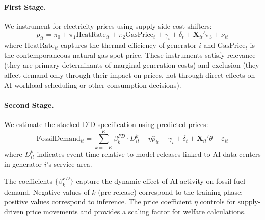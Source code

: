 \documentclass[sigconf,authordraft]{acmart}
\begin{document}
\paragraph{First Stage.} We instrument for electricity prices using supply-side cost shifters:
\begin{equation}
p_{it} = \pi_0 + \pi_1 \text{HeatRate}_{it} + \pi_2 \text{GasPrice}_{t} + \gamma_i + \delta_t + \mathbf{X}_{it}'\pi_3 + \nu_{it}
\label{eq:firststage}
\end{equation}
where $\text{HeatRate}_{it}$ captures the thermal efficiency of generator $i$ and $\text{GasPrice}_t$ is the contemporaneous natural gas spot price. These instruments satisfy relevance (they are primary determinants of marginal generation costs) and exclusion (they affect demand only through their impact on prices, not through direct effects on AI workload scheduling or other consumption decisions).

\paragraph{Second Stage.} We estimate the stacked DiD specification using predicted prices:
\begin{equation}
\text{FossilDemand}_{it} = \sum_{k=-K}^{K} \beta_k^{FD} \cdot D_{it}^k + \eta \hat{p}_{it} + \gamma_i + \delta_t + \mathbf{X}_{it}'\theta + \varepsilon_{it}
\label{eq:demand_eventstudy}
\end{equation}
where $D_{it}^k$ indicates event-time relative to model releases linked to AI data centers in generator $i$'s service area.

The coefficients $\{\beta_k^{FD}\}$ capture the dynamic effect of AI activity on fossil fuel demand. Negative values of $k$ (pre-release) correspond to the training phase; positive values correspond to inference. The price coefficient $\eta$ controls for supply-driven price movements and provides a scaling factor for welfare calculations. 


\end{document}
